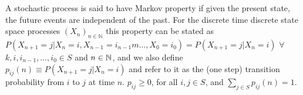  A stochastic process is said to have Markov property if given the present state, the future events are independent of the past. For the discrete time discrete state space processes $(X_n)_{n \in \mathbb{N}}$ this property can be stated as $P(X_{n+1} = j | X_{n} = i, X_{n-1} = i_{n-1}m \ldots, X_{0} = i_{0}) = P(X_{n+1} = j | X_{n}=i)$ $\forall$ $k,i,i_{n-1},\ldots,i_0 \in S$ and $n \in \mathbb{N}$, and we also define $p_{ij}(n) \equiv P(X_{n+1} = j | X_n = {i})$ and refer to it as the (one step) transition probability from $i$ to $j$ at time $n$.
 $p_{ij} \ge 0$, for all $i,j \in S$, and $\sum_{j \in S} p_{ij}(n) = 1$.